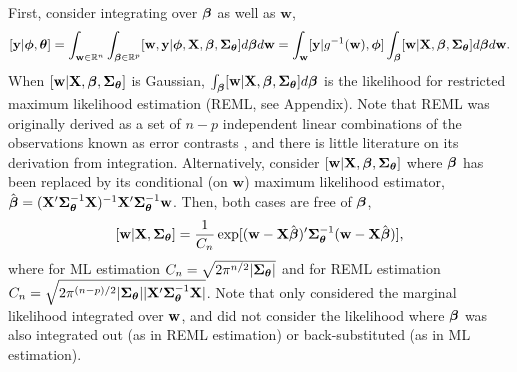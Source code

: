\documentclass[12pt, titlepage]{article}
\begin{document}
First, consider integrating over $\boldsymbol{\beta}$ as well as $\mathbf{w}$,
$$
	[\mathbf{y}|\boldsymbol{\phi},\boldsymbol{\theta}] = \int_{\mathbf{w} \in \mathbb{R}^n} \int_{\boldsymbol{\beta}\in \mathbb{R}^p} [\mathbf{w}, \mathbf{y}|\boldsymbol{\phi},\mathbf{X},\boldsymbol{\beta},\mbox{\boldmath $\Sigma$}_{\boldsymbol{\theta}}] d\boldsymbol{\beta} d\mathbf{w} =
		\int_\mathbf{w}  [\mathbf{y}|g^{-1}(\mathbf{w}),\boldsymbol{\phi}] \int_{\boldsymbol{\beta}} [\mathbf{w}|\mathbf{X},\boldsymbol{\beta},\mbox{\boldmath $\Sigma$}_{\boldsymbol{\theta}}] d\boldsymbol{\beta} d\mathbf{w}.
$$
When $[\mathbf{w}|\mathbf{X},\boldsymbol{\beta},\mbox{\boldmath $\Sigma$}_{\boldsymbol{\theta}}]$ is Gaussian, $\int_{\boldsymbol{\beta}} [\mathbf{w}|\mathbf{X},\boldsymbol{\beta},\mbox{\boldmath $\Sigma$}_{\boldsymbol{\theta}}] d\boldsymbol{\beta}$ is the likelihood for restricted maximum likelihood estimation (REML, see Appendix). Note that REML was originally derived as a set of $n - p$ independent linear combinations of the observations known as error contrasts \citep{PattersonEtAl1971Recoveryinterblockinformation545,PattersonEtAl1974Maximumlikelihoodestimation197}, and there is little literature on its derivation from integration.  Alternatively, consider $[\mathbf{w}|\mathbf{X},\boldsymbol{\beta},\mbox{\boldmath $\Sigma$}_{\boldsymbol{\theta}}]$ where $\boldsymbol{\beta}$ has been replaced by its conditional (on $\mathbf{w}$) maximum likelihood estimator, $\hat{\boldsymbol{\beta}} = (\mathbf{X}^{\prime}\mbox{\boldmath $\Sigma$}_{\boldsymbol{\theta}}^{-1}\mathbf{X})^{-1}\mathbf{X}^{\prime}\mbox{\boldmath $\Sigma$}_{\boldsymbol{\theta}}^{-1}\mathbf{w}$.  Then, both cases are free of $\boldsymbol{\beta}$,
$$
[\mathbf{w}|\mathbf{X},\mbox{\boldmath $\Sigma$}_{\boldsymbol{\theta}}] = 
\frac{1}{C_n}\exp[(\mathbf{w} - \mathbf{X}\hat{\boldsymbol{\beta}})^{\prime}\mbox{\boldmath $\Sigma$}_{\boldsymbol{\theta}}^{-1}(\mathbf{w} - \mathbf{X}\hat{\boldsymbol{\beta}})],
$$
where for ML estimation $C_n = \sqrt{2\pi^{n/2}|\mbox{\boldmath $\Sigma$}_{\boldsymbol{\theta}}|}$ and for REML estimation  \\ $C_n = \sqrt{2\pi^{(n - p)/2}|\mbox{\boldmath $\Sigma$}_{\boldsymbol{\theta}}||\mathbf{X}^{\prime}\mbox{\boldmath $\Sigma$}_{\boldsymbol{\theta}}^{-1}\mathbf{X}|}$. Note that \citet{bonat_practical_2016} only considered the marginal likelihood integrated over $\mathbf{w}$, and did not consider the likelihood where $\boldsymbol{\beta}$ was also integrated out (as in REML estimation) or back-substituted (as in ML estimation).
\end{document}
